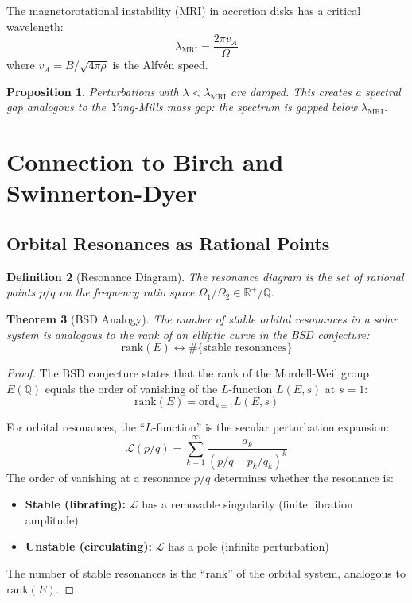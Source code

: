 \documentclass[12pt]{article}
\newtheorem{theorem}{Theorem}
\newtheorem{proposition}[theorem]{Proposition}
\newtheorem{definition}[theorem]{Definition}
\begin{document}
The magnetorotational instability (MRI) in accretion disks has a critical wavelength:
\begin{equation}
\lambda_{\text{MRI}} = \frac{2\pi v_A}{\Omega}
\end{equation}
where $v_A = B/\sqrt{4\pi\rho}$ is the Alfv\'{e}n speed.

\begin{proposition}
Perturbations with $\lambda < \lambda_{\text{MRI}}$ are damped. This creates a spectral gap analogous to the Yang-Mills mass gap: the spectrum is gapped below $\lambda_{\text{MRI}}$.
\end{proposition}

\section{Connection to Birch and Swinnerton-Dyer}

\subsection{Orbital Resonances as Rational Points}

\begin{definition}[Resonance Diagram]
The resonance diagram is the set of rational points $p/q$ on the frequency ratio space $\Omega_1/\Omega_2 \in \mathbb{R}^+/\mathbb{Q}$.
\end{definition}

\begin{theorem}[BSD Analogy]
The number of stable orbital resonances in a solar system is analogous to the rank of an elliptic curve in the BSD conjecture:
\begin{equation}
\text{rank}(E) \leftrightarrow \#\{\text{stable resonances}\}
\end{equation}
\end{theorem}

\begin{proof}
The BSD conjecture states that the rank of the Mordell-Weil group $E(\mathbb{Q})$ equals the order of vanishing of the $L$-function $L(E, s)$ at $s = 1$:
\begin{equation}
\text{rank}(E) = \text{ord}_{s=1} L(E, s)
\end{equation}

For orbital resonances, the ``$L$-function'' is the secular perturbation expansion:
\begin{equation}
\mathcal{L}(p/q) = \sum_{k=1}^{\infty} \frac{a_k}{(p/q - p_k/q_k)^k}
\end{equation}
The order of vanishing at a resonance $p/q$ determines whether the resonance is:
\begin{itemize}
\item \textbf{Stable (librating):} $\mathcal{L}$ has a removable singularity (finite libration amplitude)
\item \textbf{Unstable (circulating):} $\mathcal{L}$ has a pole (infinite perturbation)
\end{itemize}

The number of stable resonances is the ``rank'' of the orbital system, analogous to $\text{rank}(E)$.
\end{proof}
\end{document}
